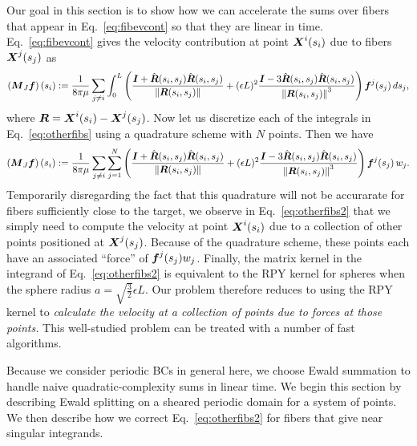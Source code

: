 Our goal in this section is to show how we can accelerate the sums over fibers that appear in Eq.\ \eqref{eq:fibevcont} so that they are linear in time. Eq.\ \eqref{eq:fibevcont} gives the velocity contribution at point $\boldsymbol{X}^i(s_i)$ due to fibers $\boldsymbol{X}^j(s_j)$ as 
\begin{equation}
\label{eq:otherfibs}
\left(\boldsymbol{M}_{J}\boldsymbol{f}\right)(s_i) := \frac{1}{8\pi\mu}\sum_{j \neq i} \int_0^L \left(\frac{\boldsymbol{I}+\hat{\boldsymbol{R}}(s_i,s_j)\hat{\boldsymbol{R}}(s_i,s_j)}{\left\Vert \boldsymbol{R}(s_i,s_j)\right\Vert} + (\epsilon L)^2 \frac{\boldsymbol{I}-3\hat{\boldsymbol{R}}(s_i,s_j)\hat{\boldsymbol{R}}(s_i,s_j)}{\left\Vert \boldsymbol{R}(s_i,s_j)\right\Vert^3}\right)\boldsymbol{f}^j(s_j) \, ds_j,
\end{equation}
where $\boldsymbol{R}=\boldsymbol{X}^i(s_i)-\boldsymbol{X}^j(s_j)$. Now let us discretize each of the integrals in Eq.\ \eqref{eq:otherfibs} using a quadrature scheme with $N$ points. Then we have 
\begin{equation}
\label{eq:otherfibs2}
\left(\boldsymbol{M}_{J}\boldsymbol{f}\right)(s_i) := \frac{1}{8\pi\mu}\sum_{j \neq i}\sum_{j=1}^N \left(\frac{\boldsymbol{I}+\hat{\boldsymbol{R}}(s_i,s_j)\hat{\boldsymbol{R}}(s_i,s_j)}{\left\Vert \boldsymbol{R}(s_i,s_j)\right\Vert} + (\epsilon L)^2 \frac{\boldsymbol{I}-3\hat{\boldsymbol{R}}(s_i,s_j)\hat{\boldsymbol{R}}(s_i,s_j)}{\left\Vert \boldsymbol{R}(s_i,s_j)\right\Vert^3}\right)\boldsymbol{f}^j(s_j) \, w_j. 
\end{equation}
Temporarily disregarding the fact that this quadrature will not be accurarate for fibers sufficiently close to the target, we observe in Eq.\ \eqref{eq:otherfibs2} that we simply need to compute the velocity at point $\boldsymbol{X}^i(s_i)$ due to a collection of other points positioned at $\boldsymbol{X}^j(s_j)$. Because of the quadrature scheme, these points each have an associated ``force'' of $\boldsymbol{f}^j(s_j)w_j$. Finally, the matrix kernel in the integrand of Eq.\ \eqref{eq:otherfibs2} is equivalent to the RPY kernel \cite{rpyOG, PSRPY} for spheres when the sphere radius $a=\sqrt{\frac{3}{2}}\epsilon L$. Our problem therefore reduces to using the RPY kernel to \textit{calculate the velocity at a collection of points due to forces at those points.} This well-studied problem can be treated with a number of fast algorithms. 

Because we consider periodic BCs in general here, we choose Ewald summation to handle naive quadratic-complexity sums in linear time. We begin this section by describing Ewald splitting on a sheared periodic domain for a system of points. We then describe how we correct Eq.\ \eqref{eq:otherfibs2} for fibers that give near singular integrands. 

